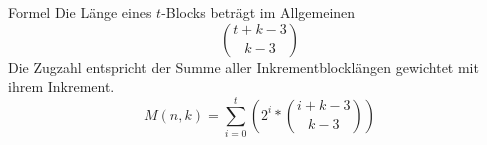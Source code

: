 \begin{frame}{Formel}
    Die Länge eines $t$-Blocks beträgt im Allgemeinen \[\binom{t+k-3}{k-3}\]
    Die Zugzahl entspricht der Summe aller Inkrementblocklängen gewichtet mit ihrem Inkrement.
    \[M(n,k)=\sum_{i=0}^{t}\left(2^i*\binom{i+k-3}{k-3}\right)\]
\end{frame}